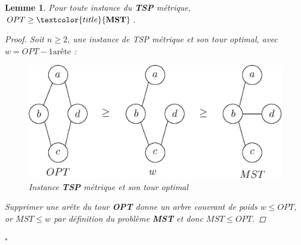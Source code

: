 \documentclass[12pt]{article}
\newcommand{\titre}[1]{\textcolor{title}{#1}}
\newcommand{\cqfd}{\begin{flushright}$\square$\end{flushright}}
\newtheorem{lemme}{Lemme}[section]
\newtheorem{proof}{Preuve}[section]
\begin{document}
\begin{lemme}\label{optgeqmst}
Pour toute instance du \textbf{\titre{TSP}} métrique, $OPT \geq \titre{\mathbf{MST}}$.
\begin{proof}
Soit $n\geq 2$, une instance de TSP métrique et son tour optimal, avec $w = OPT - 1 \text{arête}$ :
\begin{figure}[H]
    \begin{center}
    \includegraphics[scale=0.6]{optTSP.eps}
    \caption{Instance \textbf{\titre{TSP}} métrique et son tour optimal}
    \end{center}
\end{figure}
Supprimer une arête du tour \textbf{OPT} donne un arbre couvrant de poids $w\leq OPT$, or $MST\leq w$ par définition du problème
\textbf{\titre{MST}} et donc $MST\leq OPT$.
\end{proof}
\cqfd
\end{lemme}
\end{document}
